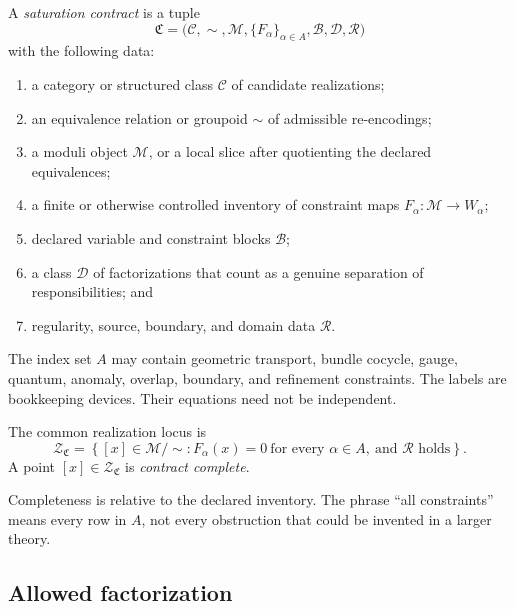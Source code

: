 \documentclass[11pt]{article}
\newcommand{\Contract}{\mathfrak C}
\newcommand{\Mod}{\mathcal M}
\newcommand{\Sol}{\mathcal Z}
\newcommand{\Cat}{\mathcal C}
\newcommand{\Blocks}{\mathcal B}
\newcommand{\Decomp}{\mathcal D}
\begin{document}
\begin{definition}\label{def:contract}
A \emph{saturation contract} is a tuple
\[
 \Contract
 =
 \bigl(
 \Cat,\sim,\Mod,\{F_\alpha\}_{\alpha\in A},
 \Blocks,\Decomp,\mathcal R
 \bigr)
\]
with the following data:
\begin{enumerate}
\item a category or structured class $\Cat$ of candidate realizations;
\item an equivalence relation or groupoid $\sim$ of admissible
re-encodings;
\item a moduli object $\Mod$, or a local slice after quotienting the declared
equivalences;
\item a finite or otherwise controlled inventory of constraint maps
$F_\alpha:\Mod\to W_\alpha$;
\item declared variable and constraint blocks $\Blocks$;
\item a class $\Decomp$ of factorizations that count as a genuine separation
of responsibilities; and
\item regularity, source, boundary, and domain data $\mathcal R$.
\end{enumerate}
\end{definition}

The index set $A$ may contain geometric transport, bundle cocycle, gauge,
quantum, anomaly, overlap, boundary, and refinement constraints.  The labels
are bookkeeping devices.  Their equations need not be independent.

\begin{definition}
The common realization locus is
\[
 \Sol_{\Contract}
 =
 \left\{
 [x]\in\Mod/{\sim}:
 F_\alpha(x)=0\ \text{for every }\alpha\in A,
 \ \text{and }\mathcal R\text{ holds}
 \right\}.
\]
A point $[x]\in\Sol_{\Contract}$ is \emph{contract complete}.
\end{definition}

Completeness is relative to the declared inventory.  The phrase ``all
constraints'' means every row in $A$, not every obstruction that could be
invented in a larger theory.

\subsection{Allowed factorization}
\end{document}

